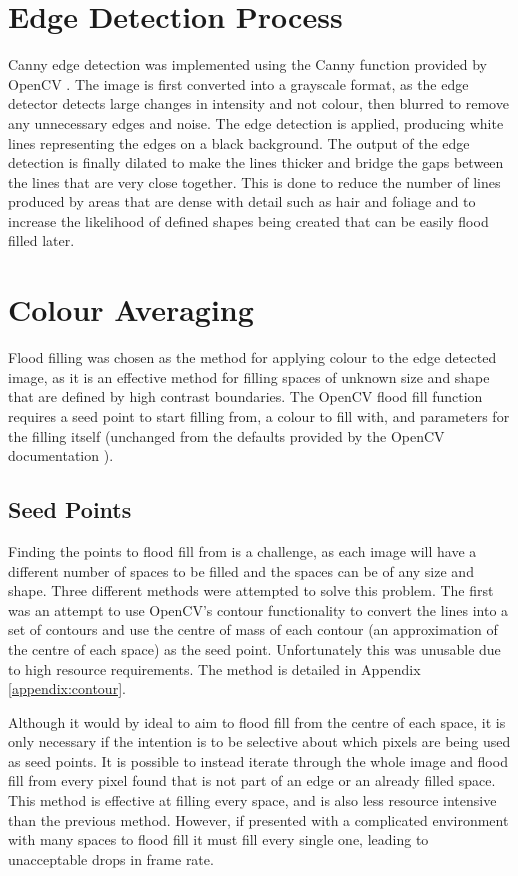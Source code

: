 \section{Edge Detection Process}

Canny edge detection was implemented using the Canny function provided by OpenCV \cite{OpenCV}. The image is first converted into a grayscale format, as the edge detector detects large changes in intensity and not colour, then blurred to remove any unnecessary edges and noise. The edge detection is applied, producing white lines representing the edges on a black background. The output of the edge detection is finally dilated to make the lines thicker and bridge the gaps between the lines that are very close together. This is done to reduce the number of lines produced by areas that are dense with detail such as hair and foliage and to increase the likelihood of defined shapes being created that can be easily flood filled later.

\section{Colour Averaging}

Flood filling was chosen as the method for applying colour to the edge detected image, as it is an effective method for filling spaces of unknown size and shape that are defined by high contrast boundaries. The OpenCV flood fill function requires a seed point to start filling from, a colour to fill with, and parameters for the filling itself (unchanged from the defaults provided by the OpenCV documentation \cite{opencvffilldemo}).

\subsection{Seed Points}

Finding the points to flood fill from is a challenge, as each image will have a different number of spaces to be filled and the spaces can be of any size and shape. Three different methods were attempted to solve this problem. The first was an attempt to use OpenCV's contour functionality to convert the lines into a set of contours and use the centre of mass of each contour (an approximation of the centre of each space) as the seed point. Unfortunately this was unusable due to high resource requirements. The method is detailed in Appendix \ref{appendix:contour}.

Although it would by ideal to aim to flood fill from the centre of each space, it is only necessary if the intention is to be selective about which pixels are being used as seed points. It is possible to instead iterate through the whole image and flood fill from every pixel found that is not part of an edge or an already filled space. This method is effective at filling every space, and is also less resource intensive than the previous method. However, if presented with a complicated environment with many spaces to flood fill it must fill every single one, leading to unacceptable drops in frame rate.

